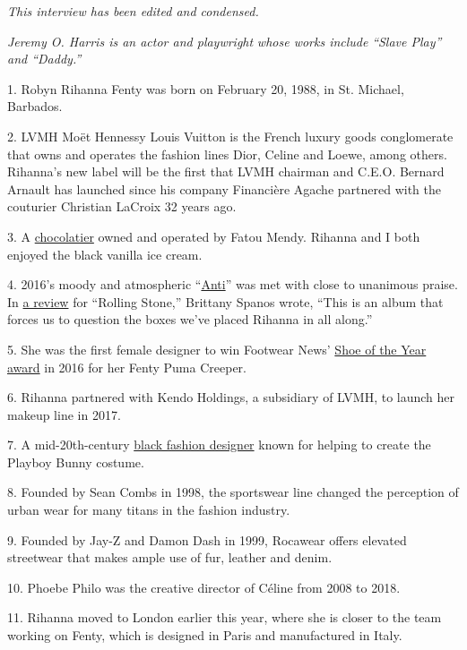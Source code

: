 \emph{This interview has been edited and condensed.}

\emph{Jeremy O. Harris is an actor and playwright} \emph{whose works
include} \emph{``Slave Play'' and ``Daddy.''}

1. Robyn Rihanna Fenty was born on February 20, 1988, in St. Michael,
Barbados.

2. LVMH Moët Hennessy Louis Vuitton is the French luxury goods
conglomerate that owns and operates the fashion lines Dior, Celine and
Loewe, among others. Rihanna's new label will be the first that LVMH
chairman and C.E.O. Bernard Arnault has launched since his company
Financière Agache partnered with the couturier Christian LaCroix 32
years ago.

3. A \href{https://www.darksugars.co.uk/}{chocolatier} owned and
operated by Fatou Mendy. Rihanna and I both enjoyed the black vanilla
ice cream.

4. 2016's moody and atmospheric
``\href{https://open.spotify.com/album/3Q149ZH46Z0f3oDR7vlDYV}{Anti}''
was met with close to unanimous praise. In
\href{https://www.rollingstone.com/music/music-album-reviews/anti-194522/}{a
review} for ``Rolling Stone,'' Brittany Spanos wrote, ``This is an album
that forces us to question the boxes we've placed Rihanna in all
along.''

5. She was the first female designer to win Footwear News'
\href{https://footwearnews.com/2016/fashion/designers/rihanna-wins-shoe-of-the-year-fenty-puma-creepers-footwear-news-achievement-awards-fnaa-2016-272599/}{Shoe
of the Year award} in 2016 for her Fenty Puma Creeper.

6. Rihanna partnered with Kendo Holdings, a subsidiary of LVMH, to
launch her makeup line in 2017.

7. A mid-20th-century
\href{https://www.nytimes3xbfgragh.onion/interactive/2019/obituaries/zelda-wynn-valdes-overlooked.html}{black
fashion designer} known for helping to create the Playboy Bunny costume.

8. Founded by Sean Combs in 1998, the sportswear line changed the
perception of urban wear for many titans in the fashion industry.

9. Founded by Jay-Z and Damon Dash in 1999, Rocawear offers elevated
streetwear that makes ample use of fur, leather and denim.

10. Phoebe Philo was the creative director of Céline from 2008 to 2018.

11. Rihanna moved to London earlier this year, where she is closer to
the team working on Fenty, which is designed in Paris and manufactured
in Italy.

